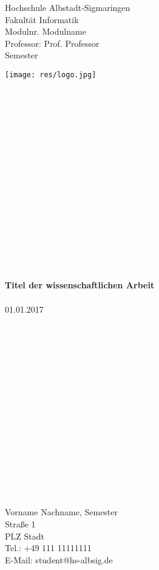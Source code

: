 \documentclass[a4paper, 11pt]{article}
\begin{document}
\begin{minipage}{0.7\textwidth}\raggedright
Hochschule Albstadt-Sigmaringen\\
Fakultät Informatik\\
Modulnr. Modulname\\
Professor: Prof. Professor\\
Semester
\end{minipage}
\begin{minipage}{0.3\textwidth}
\texttt{[image: res/logo.jpg]}
\end{minipage}
\noindent
\begin{verbatim}



















\end{verbatim}

\begin{center}
\large
{\selectfont
\textbf{Titel der wissenschaftlichen Arbeit}
}\\
\ \\
01.01.2017
\end{center}

\begin{verbatim}

















\end{verbatim}

\ \\
Vorname Nachname, Semester\\
Straße 1\\
PLZ Stadt\\
Tel.: +49 111 11111111\\
E-Mail: student@hs-albsig.de

\end{document}
